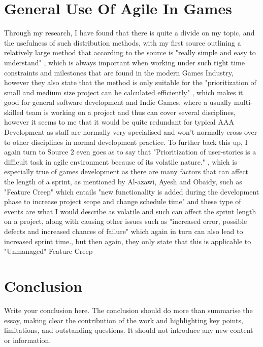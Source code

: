 \documentclass{scrartcl}
\begin{document}
\section{General Use Of Agile In Games}

Through my research, I have found that there is quite a divide on my topic, and the usefulness of such distribution methods, with my first source outlining a relatively large method that according to the source is "really simple and easy to understand" \cite{popli2014prioritising}, which is always important when working under such tight time constraints and milestones that are found in the modern Games Industry, however they also state that the method is only suitable for the "prioritization of small and medium size project can be calculated efficiently" \cite{popli2014prioritising}, which makes it good for general software development and Indie Games, where a usually multi-skilled team is working on a project and thus can cover several disciplines, however it seems to me that it would be quite redundant for typical AAA Development as staff are normally very specialised and won't normally cross over to other disciplines in normal development practice. To further back this up, I again turn to Source 2 even goes as to say that "Prioritization of user-stories is a difficult task in agile environment because of its volatile nature." \cite{popli2014prioritising}, which is especially true of games development as there are many factors that can affect the length of a sprint, as mentioned by Al-azawi, Ayesh and Obaidy, such as "Feature Creep" \cite{al2014towards} which entails "new functionality is added during the development phase to increase project scope and change schedule time" \cite{al2014towards} and these type of events are what I would describe as volatile and such can affect the sprint length on a project, along with causing other issues such as "increased error, possible defects and increased chances of failure" \cite{al2014towards} which again in turn can also lead to increased sprint time., but then again, they only state that this is applicable to "Unmanaged" \cite{al2014towards} Feature Creep  

\section{Conclusion}

Write your conclusion here. The conclusion should do more than summarise the essay, making clear the contribution of the work and highlighting key points, limitations, and outstanding questions. It should not introduce any new content or information.
\end{document}
